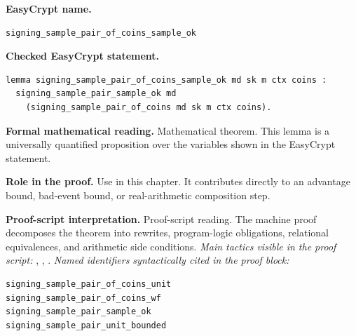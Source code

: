 \begin{formaltheorem}
\noindent\textbf{EasyCrypt name.}
\begin{lstlisting}[language=EasyCrypt,basicstyle=\ttfamily\scriptsize]
signing_sample_pair_of_coins_sample_ok
\end{lstlisting}
\noindent\textbf{Checked EasyCrypt statement.}
\begin{lstlisting}[language=EasyCrypt,basicstyle=\ttfamily\scriptsize]
lemma signing_sample_pair_of_coins_sample_ok md sk m ctx coins :
  signing_sample_pair_sample_ok md
    (signing_sample_pair_of_coins md sk m ctx coins).
\end{lstlisting}
\noindent\textbf{Formal mathematical reading.}
Mathematical theorem. This lemma is a universally quantified proposition over the variables shown in the EasyCrypt statement.

\noindent\textbf{Role in the proof.}
Use in this chapter. It contributes directly to an advantage bound, bad-event bound, or real-arithmetic composition step.

\noindent\textbf{Proof-script interpretation.}
Proof-script reading. The machine proof decomposes the theorem into rewrites, program-logic obligations, relational equivalences, and arithmetic side conditions.
\emph{Main tactics visible in the proof script:} , , .
\emph{Named identifiers syntactically cited in the proof block:}
\begin{lstlisting}[language=EasyCrypt,basicstyle=\ttfamily\scriptsize]
signing_sample_pair_of_coins_unit
signing_sample_pair_of_coins_wf
signing_sample_pair_sample_ok
signing_sample_pair_unit_bounded
\end{lstlisting}

\end{formaltheorem}

